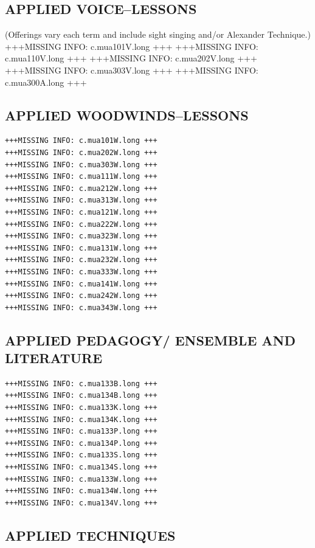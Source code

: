 \documentclass[
  letterpaper,
]{scrbook}
\begin{document}
\subsection{APPLIED VOICE--LESSONS}\label{applied-voicelessons}

(Offerings vary each term and include sight singing and/or Alexander
Technique.) +++MISSING INFO: c.mua101V.long +++ +++MISSING INFO:
c.mua110V.long +++ +++MISSING INFO: c.mua202V.long +++ +++MISSING INFO:
c.mua303V.long +++ +++MISSING INFO: c.mua300A.long +++

\subsection{APPLIED WOODWINDS--LESSONS}\label{applied-woodwindslessons}

\begin{verbatim}
+++MISSING INFO: c.mua101W.long +++
+++MISSING INFO: c.mua202W.long +++
+++MISSING INFO: c.mua303W.long +++
+++MISSING INFO: c.mua111W.long +++
+++MISSING INFO: c.mua212W.long +++
+++MISSING INFO: c.mua313W.long +++
+++MISSING INFO: c.mua121W.long +++
+++MISSING INFO: c.mua222W.long +++
+++MISSING INFO: c.mua323W.long +++
+++MISSING INFO: c.mua131W.long +++
+++MISSING INFO: c.mua232W.long +++
+++MISSING INFO: c.mua333W.long +++
+++MISSING INFO: c.mua141W.long +++
+++MISSING INFO: c.mua242W.long +++
+++MISSING INFO: c.mua343W.long +++
\end{verbatim}

\subsection{APPLIED PEDAGOGY/ ENSEMBLE AND
LITERATURE}\label{applied-pedagogy-ensemble-and-literature}

\begin{verbatim}
+++MISSING INFO: c.mua133B.long +++
+++MISSING INFO: c.mua134B.long +++
+++MISSING INFO: c.mua133K.long +++
+++MISSING INFO: c.mua134K.long +++
+++MISSING INFO: c.mua133P.long +++
+++MISSING INFO: c.mua134P.long +++
+++MISSING INFO: c.mua133S.long +++
+++MISSING INFO: c.mua134S.long +++
+++MISSING INFO: c.mua133W.long +++
+++MISSING INFO: c.mua134W.long +++
+++MISSING INFO: c.mua134V.long +++
\end{verbatim}

\subsection{APPLIED TECHNIQUES}\label{applied-techniques}
\end{document}
